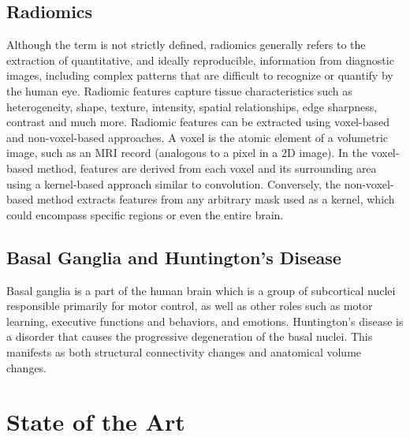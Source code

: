 \subsection{Radiomics}

Although the term is not strictly defined, radiomics generally refers to the extraction of quantitative, and ideally reproducible, information from diagnostic images, including complex patterns that are difficult to recognize or quantify by the human eye. \cite{radio} Radiomic features capture tissue characteristics such as heterogeneity, shape, texture, intensity, spatial relationships, edge sharpness, contrast and much more. \cite{radio2} Radiomic features can be extracted using voxel-based and non-voxel-based approaches. A voxel is the atomic element of a volumetric image, such as an MRI record (analogous to a pixel in a 2D image). In the voxel-based method, features are derived from each voxel and its surrounding area using a kernel-based approach similar to convolution. Conversely, the non-voxel-based method extracts features from any arbitrary mask used as a kernel, which could encompass specific regions or even the entire brain.

\subsection{Basal Ganglia and Huntington’s Disease}

Basal ganglia is a part of the human brain which is a group of subcortical nuclei responsible primarily for motor control, as well as other roles such as motor learning, executive functions and behaviors, and emotions. \cite{basal} Huntington’s disease is a disorder that causes the progressive degeneration of the basal nuclei. \cite{hunting} This manifests as both structural connectivity changes and anatomical volume changes. \cite{basal2}\par

\section{State of the Art}

